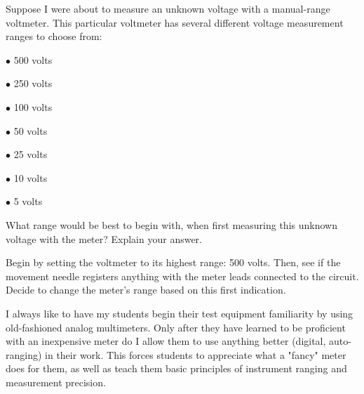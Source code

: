 

Suppose I were about to measure an unknown voltage with a manual-range voltmeter.  This particular voltmeter has several different voltage measurement ranges to choose from:

\medskip
\item{$\bullet$} 500 volts
\item{$\bullet$} 250 volts
\item{$\bullet$} 100 volts
\item{$\bullet$} 50 volts
\item{$\bullet$} 25 volts
\item{$\bullet$} 10 volts
\item{$\bullet$} 5 volts
\medskip

What range would be best to begin with, when first measuring this unknown voltage with the meter?  Explain your answer.







Begin by setting the voltmeter to its highest range: 500 volts.  Then, see if the movement needle registers anything with the meter leads connected to the circuit.  Decide to change the meter's range based on this first indication.







I always like to have my students begin their test equipment familiarity by using old-fashioned analog multimeters.  Only after they have learned to be proficient with an inexpensive meter do I allow them to use anything better (digital, auto-ranging) in their work.  This forces students to appreciate what a "fancy" meter does for them, as well as teach them basic principles of instrument ranging and measurement precision.




